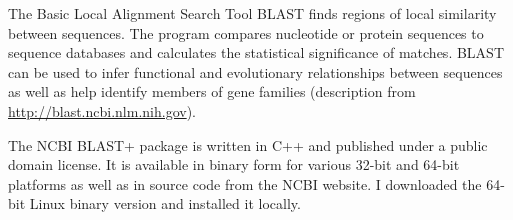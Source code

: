 The Basic Local Alignment Search Tool BLAST \citep{altschul1990} finds regions
of local similarity between sequences. The program compares nucleotide or
protein sequences to sequence databases and calculates the statistical
significance of matches. BLAST can be used to infer functional and evolutionary
relationships between sequences as well as help identify members of gene
families (description from \url{http://blast.ncbi.nlm.nih.gov}).

The NCBI BLAST+ package is written in C++ and published under a public domain
license. It is available in binary form for various 32-bit and 64-bit platforms
as well as in source code from the NCBI website. I downloaded the 64-bit Linux
binary version and installed it locally.
